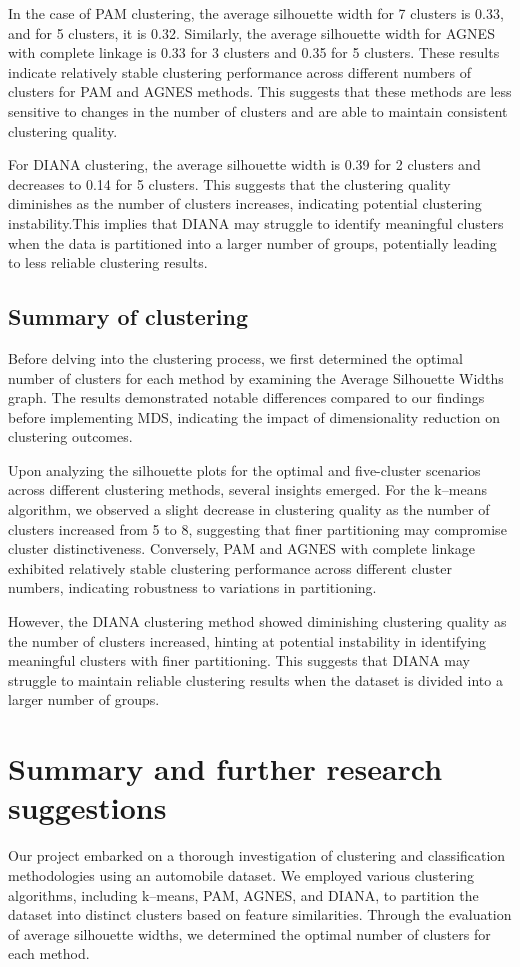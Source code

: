 \documentclass[11pt,a4paper]{article}\usepackage[]{graphicx}\usepackage[]{xcolor}
\begin{document}
In the case of PAM clustering, the average silhouette width for 7 clusters is 0.33, and for 5 clusters, it is 0.32. Similarly, the average silhouette width for AGNES with complete linkage is 0.33 for 3 clusters and 0.35 for 5 clusters. These results indicate relatively stable clustering performance across different numbers of clusters for PAM and AGNES methods. This suggests that these methods are less sensitive to changes in the number of clusters and are able to maintain consistent clustering quality.

For DIANA clustering, the average silhouette width is 0.39 for 2 clusters and decreases to 0.14 for 5 clusters. This suggests that the clustering quality diminishes as the number of clusters increases, indicating potential clustering instability.This implies that DIANA may struggle to identify meaningful clusters when the data is partitioned into a larger number of groups, potentially leading to less reliable clustering results.

\subsection{Summary of clustering}
Before delving into the clustering process, we first determined the optimal number of clusters for each method by examining the Average Silhouette Widths graph. The results demonstrated notable differences compared to our findings before implementing MDS, indicating the impact of dimensionality reduction on clustering outcomes.

Upon analyzing the silhouette plots for the optimal and five-cluster scenarios across different clustering methods, several insights emerged. For the k--means algorithm, we observed a slight decrease in clustering quality as the number of clusters increased from 5 to 8, suggesting that finer partitioning may compromise cluster distinctiveness. Conversely, PAM and AGNES with complete linkage exhibited relatively stable clustering performance across different cluster numbers, indicating robustness to variations in partitioning.

However, the DIANA clustering method showed diminishing clustering quality as the number of clusters increased, hinting at potential instability in identifying meaningful clusters with finer partitioning. This suggests that DIANA may struggle to maintain reliable clustering results when the dataset is divided into a larger number of groups.
	\section{Summary and further research suggestions}
	Our project embarked on a thorough investigation of clustering and classification methodologies using an automobile dataset. We employed various clustering algorithms, including k--means, PAM, AGNES, and DIANA, to partition the dataset into distinct clusters based on feature similarities. Through the evaluation of average silhouette widths, we determined the optimal number of clusters for each method.
\end{document}
